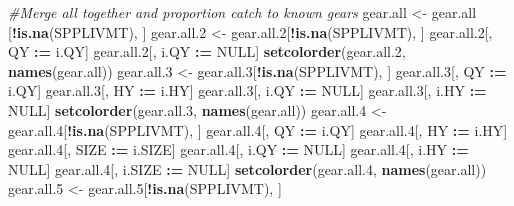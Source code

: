\documentclass[]{article}
\newenvironment{Shaded}{\begin{snugshade}}{\end{snugshade}}
\newcommand{\KeywordTok}[1]{\textcolor[rgb]{0.13,0.29,0.53}{\textbf{#1}}}
\newcommand{\DecValTok}[1]{\textcolor[rgb]{0.00,0.00,0.81}{#1}}
\newcommand{\StringTok}[1]{\textcolor[rgb]{0.31,0.60,0.02}{#1}}
\newcommand{\CommentTok}[1]{\textcolor[rgb]{0.56,0.35,0.01}{\textit{#1}}}
\newcommand{\OtherTok}[1]{\textcolor[rgb]{0.56,0.35,0.01}{#1}}
\newcommand{\OperatorTok}[1]{\textcolor[rgb]{0.81,0.36,0.00}{\textbf{#1}}}
\newcommand{\ErrorTok}[1]{\textcolor[rgb]{0.64,0.00,0.00}{\textbf{#1}}}
\newcommand{\NormalTok}[1]{#1}
\begin{document}
\begin{Shaded}
\begin{Highlighting}[]
  \CommentTok{#Merge all together and proportion catch to known gears}
\NormalTok{  gear.all   <-}\StringTok{ }\NormalTok{gear.all  [}\OperatorTok{!}\KeywordTok{is.na}\NormalTok{(SPPLIVMT), ]}
\NormalTok{  gear.all.}\DecValTok{2}\NormalTok{ <-}\StringTok{ }\NormalTok{gear.all.}\DecValTok{2}\NormalTok{[}\OperatorTok{!}\KeywordTok{is.na}\NormalTok{(SPPLIVMT), ]}
\NormalTok{  gear.all.}\DecValTok{2}\NormalTok{[, QY   }\OperatorTok{:}\ErrorTok{=}\StringTok{ }\NormalTok{i.QY]}
\NormalTok{  gear.all.}\DecValTok{2}\NormalTok{[, i.QY }\OperatorTok{:}\ErrorTok{=}\StringTok{ }\OtherTok{NULL}\NormalTok{]}
  \KeywordTok{setcolorder}\NormalTok{(gear.all.}\DecValTok{2}\NormalTok{, }\KeywordTok{names}\NormalTok{(gear.all))}
\NormalTok{  gear.all.}\DecValTok{3}\NormalTok{ <-}\StringTok{ }\NormalTok{gear.all.}\DecValTok{3}\NormalTok{[}\OperatorTok{!}\KeywordTok{is.na}\NormalTok{(SPPLIVMT), ]}
\NormalTok{  gear.all.}\DecValTok{3}\NormalTok{[, QY   }\OperatorTok{:}\ErrorTok{=}\StringTok{ }\NormalTok{i.QY]}
\NormalTok{  gear.all.}\DecValTok{3}\NormalTok{[, HY   }\OperatorTok{:}\ErrorTok{=}\StringTok{ }\NormalTok{i.HY]}
\NormalTok{  gear.all.}\DecValTok{3}\NormalTok{[, i.QY }\OperatorTok{:}\ErrorTok{=}\StringTok{ }\OtherTok{NULL}\NormalTok{]}
\NormalTok{  gear.all.}\DecValTok{3}\NormalTok{[, i.HY }\OperatorTok{:}\ErrorTok{=}\StringTok{ }\OtherTok{NULL}\NormalTok{]}
  \KeywordTok{setcolorder}\NormalTok{(gear.all.}\DecValTok{3}\NormalTok{, }\KeywordTok{names}\NormalTok{(gear.all))}
\NormalTok{  gear.all.}\DecValTok{4}\NormalTok{ <-}\StringTok{ }\NormalTok{gear.all.}\DecValTok{4}\NormalTok{[}\OperatorTok{!}\KeywordTok{is.na}\NormalTok{(SPPLIVMT), ]}
\NormalTok{  gear.all.}\DecValTok{4}\NormalTok{[, QY     }\OperatorTok{:}\ErrorTok{=}\StringTok{ }\NormalTok{i.QY]}
\NormalTok{  gear.all.}\DecValTok{4}\NormalTok{[, HY     }\OperatorTok{:}\ErrorTok{=}\StringTok{ }\NormalTok{i.HY]}
\NormalTok{  gear.all.}\DecValTok{4}\NormalTok{[, SIZE   }\OperatorTok{:}\ErrorTok{=}\StringTok{ }\NormalTok{i.SIZE]}
\NormalTok{  gear.all.}\DecValTok{4}\NormalTok{[, i.QY   }\OperatorTok{:}\ErrorTok{=}\StringTok{ }\OtherTok{NULL}\NormalTok{]}
\NormalTok{  gear.all.}\DecValTok{4}\NormalTok{[, i.HY   }\OperatorTok{:}\ErrorTok{=}\StringTok{ }\OtherTok{NULL}\NormalTok{]}
\NormalTok{  gear.all.}\DecValTok{4}\NormalTok{[, i.SIZE }\OperatorTok{:}\ErrorTok{=}\StringTok{ }\OtherTok{NULL}\NormalTok{]}
  \KeywordTok{setcolorder}\NormalTok{(gear.all.}\DecValTok{4}\NormalTok{, }\KeywordTok{names}\NormalTok{(gear.all))}
\NormalTok{  gear.all.}\DecValTok{5}\NormalTok{ <-}\StringTok{ }\NormalTok{gear.all.}\DecValTok{5}\NormalTok{[}\OperatorTok{!}\KeywordTok{is.na}\NormalTok{(SPPLIVMT), ]}

\end{Highlighting}
\end{Shaded}
\end{document}
